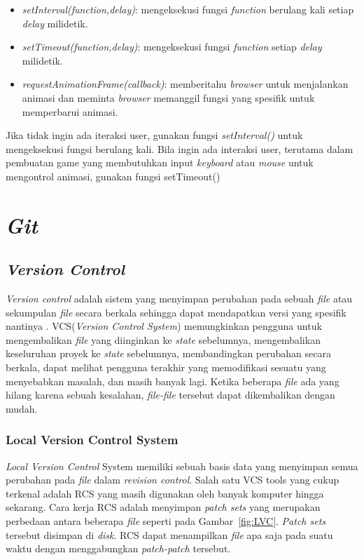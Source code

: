 \begin{itemize}
	\item \textit{setInterval(function,delay)}: mengeksekusi fungsi \textit{function} berulang kali setiap \textit{delay} milidetik.
	\item \textit{setTimeout(function,delay)}: mengeksekusi fungsi \textit{function} setiap \textit{delay} milidetik.
	\item \textit{requestAnimationFrame(callback)}: memberitahu \textit{browser} untuk menjalankan animasi dan meminta \textit{browser} memanggil fungsi yang spesifik untuk memperbarui animasi.
\end{itemize}

Jika tidak ingin ada iteraksi user, gunakan fungsi \textit{setInterval()} untuk mengeksekusi fungsi berulang kali. Bila ingin ada interaksi user, terutama dalam pembuatan game yang membutuhkan input \textit{keyboard} atau \textit{mouse} untuk mengontrol animasi, gunakan fungsi setTimeout()

\section{\textit{Git}}
\label{sec:Git}

\subsection{\textit{Version Control}}
\textit{Version control} adalah sistem yang menyimpan perubahan pada sebuah \textit{file} atau sekumpulan \textit{file} secara berkala sehingga dapat mendapatkan versi yang spesifik nantinya \cite{chacon2014pro}. VCS(\textit{Version Control System}) memungkinkan pengguna untuk mengembalikan \textit{file} yang diinginkan ke \textit{state} sebelumnya, mengembalikan keseluruhan proyek ke \textit{state} sebelumnya, membandingkan perubahan secara berkala, dapat melihat pengguna terakhir yang memodifikasi sesuatu yang menyebabkan masalah, dan masih banyak lagi. Ketika beberapa \textit{file} ada yang hilang karena sebuah kesalahan, \textit{file-file} tersebut dapat dikembalikan dengan mudah. 

\subsubsection{Local Version Control System}
\textit{Local Version Control} System memiliki sebuah basis data yang menyimpan semua perubahan pada \textit{file} dalam \textit{revision control}. Salah satu VCS tools yang cukup terkenal adalah RCS yang masih digunakan oleh banyak komputer hingga sekarang. Cara kerja RCS adalah menyimpan \textit{patch sets} yang merupakan perbedaan antara beberapa \textit{file} seperti pada Gambar~\ref{fig:LVC}. \textit{Patch sets} tersebut disimpan di \textit{disk}. RCS dapat menampilkan \textit{file} apa saja pada suatu waktu dengan menggabungkan \textit{patch-patch} tersebut.  

